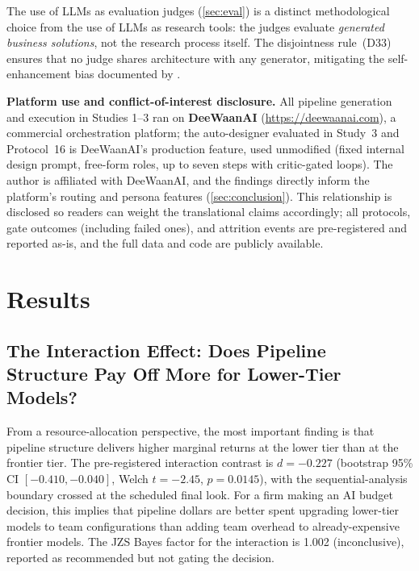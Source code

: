 \documentclass[12pt,a4paper]{article}
\begin{document}
The use of LLMs as evaluation judges (\cref{sec:eval}) is a distinct
methodological choice from the use of LLMs as research tools: the judges
evaluate \emph{generated business solutions}, not the research process itself.
The disjointness rule~(D33) ensures that no judge shares architecture with any
generator, mitigating the self-enhancement bias documented by
\citet{ZhengEtAl2023}.

\textbf{Platform use and conflict-of-interest disclosure.} All pipeline
generation and execution in Studies 1--3 ran on \textbf{DeeWaanAI}
(\url{https://deewaanai.com}), a commercial orchestration platform; the
auto-designer evaluated in Study~3 and Protocol~16 is DeeWaanAI's production
feature, used unmodified (fixed internal design prompt, free-form roles,
up to seven steps with critic-gated loops). The author is affiliated with
DeeWaanAI, and the findings directly inform the platform's routing and
persona features (\cref{sec:conclusion}). This relationship is disclosed so
readers can weight the translational claims accordingly; all protocols,
gate outcomes (including failed ones), and attrition events are
pre-registered and reported as-is, and the full data and code are publicly
available.

\section{Results}\label{sec:results}

\subsection{The Interaction Effect: Does Pipeline Structure Pay Off More for
Lower-Tier Models?}\label{sec:interaction}

From a resource-allocation perspective, the most important finding is that
pipeline structure delivers higher marginal returns at the lower tier than at
the frontier tier. The pre-registered interaction contrast is $d = -0.227$
(bootstrap 95\% CI $[-0.410, -0.040]$, Welch $t = -2.45$, $p = 0.0145$), with
the sequential-analysis boundary crossed at the scheduled final look. For a
firm making an AI budget decision, this implies that pipeline dollars are better
spent upgrading lower-tier models to team configurations than adding team overhead to
already-expensive frontier models. The JZS Bayes factor for the interaction is
1.002 (inconclusive), reported as recommended but not gating the decision.
\end{document}
